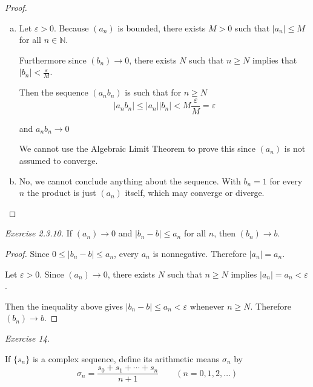 \begin{proof}

\begin{enumerate}[(a)]
	\item   Let $\varepsilon > 0$.  Because $(a_n)$ is bounded, there exists $M > 0$ such that $|a_n| \leq M$ for all $n \in \mathbb{N}$.
	
	Furthermore since $(b_n) \to 0$, there exists $N$ such that $n \geq N$ implies that $|b_n| < \frac{\varepsilon}{M}$.
	
	Then the sequence $(a_n b_n) $ is such that for $n \geq N$
	$$ |a_n b_n | \leq |a_n| |b_n| < M \frac{\varepsilon}{M} = \varepsilon $$
	
	
	and $a_n b_n  \to 0$
	
	
	We cannot use the Algebraic Limit Theorem to prove this since $(a_n)$ is not assumed to converge.
	
	
	

\item No, we cannot conclude anything about the sequence.  With $b_n = 1$ for every $n$ the product is just $(a_n)$ itself, which may converge or diverge. 
\end{enumerate}
\end{proof}

\noindent
\emph{Exercise 2.3.10.}
If $(a_n) \to 0$ and $|b_n - b| \leq a_n$ for all $n$, then $(b_n) \to b$.

\begin{proof}
	Since $0 \leq |b_n - b| \leq a_n$, every $a_n$ is nonnegative.  Therefore $|a_n| = a_n$.
	
	Let $\varepsilon > 0$.  Since $(a_n) \to 0$, there exists $N$ such that $n \geq N$ implies $|a_n | = a_n < \varepsilon$.
	
	Then the inequality above gives $|b_n - b| \leq a_n < \varepsilon$ whenever $n \geq N$.   Therefore $(b_n) \to b$.
\end{proof}


\noindent
\emph{Exercise 14.}

  If $\{s_{n}\}$ is a complex sequence, define its arithmetic means $\sigma_{n}$ by
 $$  \sigma_{n} = \frac{s_{0} + s_{1} + \cdots + s_{n}}{n+1} \qquad (n=0,1,2,\ldots) $$
 
